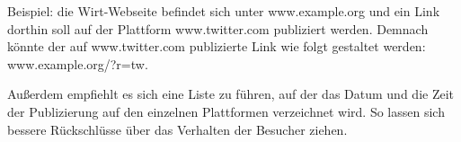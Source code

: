 Beispiel: die Wirt-Webseite befindet sich unter www.example.org und ein Link
dorthin soll auf der Plattform www.twitter.com publiziert werden. Demnach
könnte der auf www.twitter.com publizierte Link wie folgt gestaltet werden:
www.example.org/?r=tw.

Außerdem empfiehlt es sich eine Liste zu führen, auf der das Datum und die Zeit
der Publizierung auf den einzelnen Plattformen verzeichnet wird. So lassen sich
bessere Rückschlüsse über das Verhalten der Besucher ziehen.
